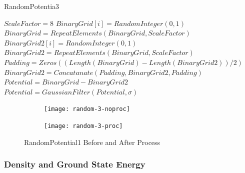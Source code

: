 \documentclass[a4paper,times,hidelinks,12pt]{article}
\begin{document}
\begin{algorithm}[H]
    \caption{RandomPotentia3}\label{euclid}
    \begin{algorithmic}[1]
        \State $ \textit{ScaleFactor} = 8$
        \State $BinaryGrid[i] = RandomInteger(0, 1)$
        \EndFor
        \State $BinaryGrid = RepeatElements(BinaryGrid, ScaleFactor)$
        \State $BinaryGrid2[i] = RandomInteger(0, 1)$
        \EndFor
        \State $BinaryGrid2 = RepeatElements(BinaryGrid, ScaleFactor)$
        \State $Padding = Zeros((Length(BinaryGrid) - Length(BinaryGrid2))/2)$
        \State $BinaryGrid2 = Concatanate(Padding, BinaryGrid2, Padding) $
        \State $Potential = BinaryGrid - BinaryGrid2$
        \State $Potential = GaussianFilter(Potential, \sigma)$ 
    \EndProcedure
    \end{algorithmic}
\label{alg:random_potential_1}
\end{algorithm}

\graphicspath{{"../figs/potentials/"}}
\begin{figure}[H]
    \centering
    \begin{subfigure}[t]{0.45\textwidth}
        \texttt{[image: random-3-noproc]}
		
    \end{subfigure}
    \begin{subfigure}[t]{0.45\textwidth}
        \texttt{[image: random-3-proc]}
		
    \end{subfigure}
\caption{RandomPotential1 Before and After Process}
\label{fig:random3_before_after}
\end{figure}

\subsubsection{Density and Ground State Energy}
\end{document}
